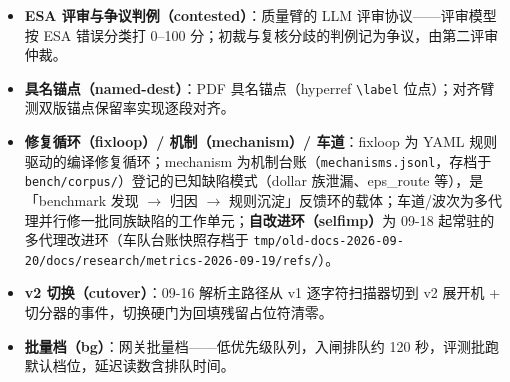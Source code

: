 \begin{itemize}
  \item \textbf{ESA 评审与争议判例（contested）}：质量臂的 LLM 评审协议——评审模型按 ESA 错误分类打 0--100 分；初裁与复核分歧的判例记为争议，由第二评审仲裁。
  \item \textbf{具名锚点（named-dest）}：PDF 具名锚点（hyperref \verb|\label| 位点）；对齐臂测双版锚点保留率实现逐段对齐。
  \item \textbf{修复循环（fixloop）/ 机制（mechanism）/ 车道}：fixloop 为 YAML 规则驱动的编译修复循环；mechanism 为机制台账（\texttt{mechanisms.jsonl}，存档于 \texttt{bench/corpus/}）登记的已知缺陷模式（dollar 族泄漏、eps\_route 等），是「benchmark 发现 $\to$ 归因 $\to$ 规则沉淀」反馈环的载体；车道/波次为多代理并行修一批同族缺陷的工作单元；\textbf{自改进环（selfimp）}为 09-18 起常驻的多代理改进环（车队台账快照存档于 \texttt{tmp/old-docs-2026-09-20/docs/research/metrics-2026-09-19/refs/}）。
  \item \textbf{v2 切换（cutover）}：09-16 解析主路径从 v1 逐字符扫描器切到 v2 展开机 + 切分器的事件，切换硬门为回填残留占位符清零。
  \item \textbf{批量档（bg）}：网关批量档——低优先级队列，入闸排队约 120 秒，评测批跑默认档位，延迟读数含排队时间。
\end{itemize}

